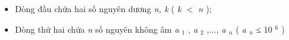 \begin{itemize}
	\item Dòng đầu chứa hai số nguyên dương \emph{ n, k } ( \emph{ k } $<$ \emph{ n } );
	\item Dòng thứ hai chứa \emph{ n } số nguyên không âm \emph{ a }$_ 1 $ , \emph{ a }$_ 2 $ ,..., \emph{ a $_ n $} ( \emph{ a $_ n $} ≤ 10 $^ 6 $ )
\end{itemize}

\
